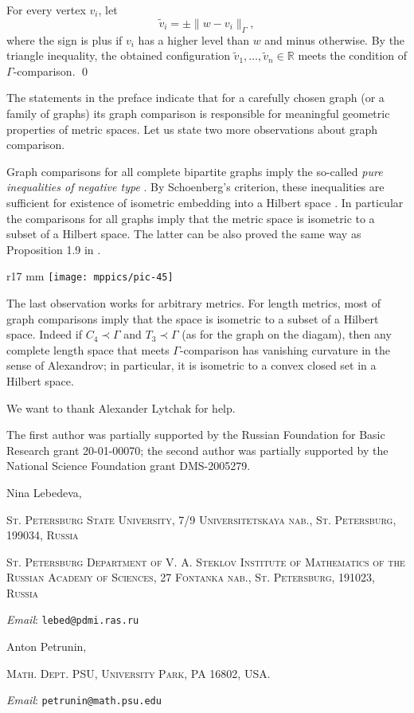 \documentclass{article}
\makeatletter
\newcommand{\Addresses}{{\bigskip\footnotesize

\noindent Nina Lebedeva,
\par\nopagebreak
 \textsc{St. Petersburg State University, 7/9 Universitetskaya nab., St. Petersburg, 199034, Russia}
\par
\nopagebreak
 \textsc{St. Petersburg Department of V. A. Steklov Institute of Mathematics of the Russian Academy of Sciences, 27 Fontanka nab., St. Petersburg, 191023, Russia}
  \par\nopagebreak
  \textit{Email}: \texttt{lebed@pdmi.ras.ru}

\medskip

\noindent   Anton Petrunin, 
\par\nopagebreak
 \textsc{Math. Dept. PSU, University Park, PA 16802, USA.}
  \par\nopagebreak
  \textit{Email}: \texttt{petrunin@math.psu.edu}
  
}}
\def\parbf#1{\medskip\noindent{\bf #1}}
\def\qeds{\qed\par\medskip}
\makeatother
\begin{document}
For every vertex $v_i$, let
\[\tilde v_i=\pm \|w-v_i\|_\Gamma,\]
where the sign is plus if $v_i$ has a higher level than $w$ and minus otherwise.
By the triangle inequality, the obtained configuration $\tilde v_1,\dots,\tilde v_n\in\mathbb{R}$ meets the condition of $\Gamma$-comparison.
\qeds

\parbf{Remarks.}
The statements in the preface indicate that for a carefully chosen graph (or a family of graphs) its graph comparison is responsible for meaningful geometric properties of metric spaces.
Let us state two more observations about graph comparison.

Graph comparisons for all complete bipartite graphs imply the so-called \emph{pure inequalities of negative type} \cite[6.1.1]{deza-laurent}.
By Schoenberg's criterion, these inequalities are sufficient for existence of isometric embedding into a Hilbert space \cite[6.2.1]{deza-laurent}.
In particular the comparisons for all graphs imply that the metric space is isometric to a subset of a Hilbert space.
The latter can be also proved the same way as Proposition 1.9 in \cite{toyoda}.

\begin{wrapfigure}{r}{17 mm}
\vskip-6mm
\centering
\texttt{[image: mppics/pic-45]}
\vskip-2mm
\end{wrapfigure}

The last observation works for arbitrary metrics.
For length metrics, most of graph comparisons imply that the space is isometric to a subset of a Hilbert space.
Indeed if $C_4\prec\Gamma$ and $T_3\prec\Gamma$ (as for the graph on the diagam), then any complete length space that meets $\Gamma$-comparison has vanishing curvature in the sense of Alexandrov; in particular, it is isometric to a convex closed set in a Hilbert space.





\parbf{Acknowledgments.}
We want to thank Alexander Lytchak for help. 

The first author was partially supported by the Russian Foundation for Basic Research grant 20-01-00070; the second author was partially supported by the National Science Foundation grant DMS-2005279.

{\sloppy
\printbibliography[heading=bibintoc]
\fussy
}

\Addresses
\end{document}
